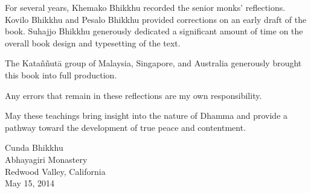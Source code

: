 For several years, Khemako Bhikkhu recorded the senior monks'
reflections. Kovilo Bhikkhu and Pesalo Bhikkhu provided corrections on
an early draft of the book. Suhajjo Bhikkhu generously dedicated a
significant amount of time on the overall book design and typesetting of
the text.

The Kataññutā group of Malaysia, Singapore, and Australia generously
brought this book into full production.

Any errors that remain in these reflections are my own responsibility.

May these teachings bring insight into the nature of Dhamma and provide
a pathway toward the development of true peace and contentment.

Cunda Bhikkhu\\Abhayagiri Monastery\\Redwood Valley, California\\May 15,
2014
